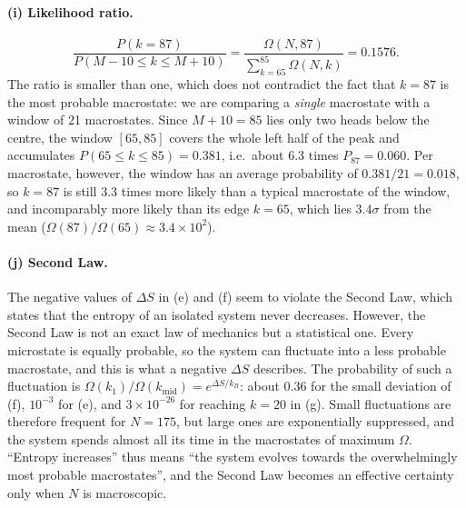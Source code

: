 \documentclass[11pt,a4paper]{article}
\newcommand{\resN}{175}                 %
\newcommand{\resNhalf}{87}              %
\newcommand{\resRatio}{0.1576}              %
\begin{document}
\paragraph{(i) Likelihood ratio.}
\begin{equation}
  \frac{P(k=\resNhalf)}{P(M-10\le k\le M+10)}
  =\frac{\Omega(N,\resNhalf)}{\sum_{k=65}^{85}\Omega(N,k)}=\resRatio .
\end{equation}
The ratio is smaller than one, which does not contradict the fact that
$k=\resNhalf$ is the most probable macrostate: we are comparing a
\emph{single} macrostate with a window of 21 macrostates. Since
$M+10=85$ lies only two heads below the centre, the window $[65,85]$
covers the whole left half of the peak and accumulates
$P(65\le k\le85)=0.381$, i.e.\ about 6.3 times $P_{87}=0.060$.
Per macrostate, however, the window has an average probability of
$0.381/21=0.018$, so $k=\resNhalf$ is still 3.3 times more likely than a
typical macrostate of the window, and incomparably more likely than its edge
$k=65$, which lies $3.4\sigma$ from the mean
($\Omega(87)/\Omega(65)\approx3.4\times10^{2}$).

\paragraph{(j) Second Law.} The negative values of $\Delta S$ in (e) and (f)
seem to violate the Second Law, which states that the entropy of an isolated
system never decreases. However, the Second Law is not an exact law of
mechanics but a statistical one. Every microstate is equally probable, so
the system can fluctuate into a less probable macrostate, and this is what a
negative $\Delta S$ describes. The probability of such a fluctuation is
$\Omega(k_1)/\Omega(k_{\mathrm{mid}})=e^{\Delta S/k_B}$: about
$0.36$ for the small deviation of (f), $10^{-3}$ for (e), and
$3\times10^{-26}$ for reaching $k=20$ in (g). Small fluctuations are
therefore frequent for $N=\resN$, but large ones are exponentially
suppressed, and the system spends almost all its time in the macrostates of
maximum $\Omega$. ``Entropy increases'' thus means ``the system evolves
towards the overwhelmingly most probable macrostates'', and the Second Law
becomes an effective certainty only when $N$ is macroscopic.
\end{document}
